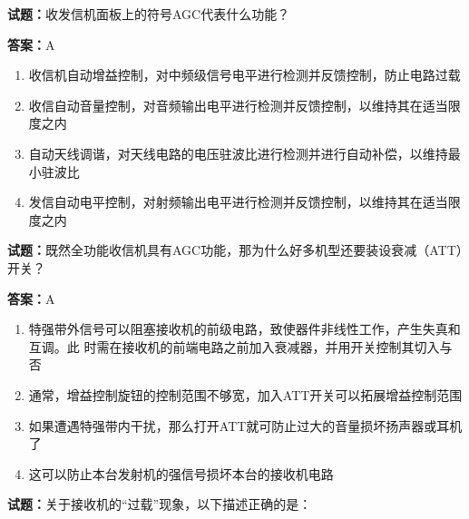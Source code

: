 \documentclass{ctexbook}
\begin{document}
\textbf{试题：}收发信机面板上的符号AGC代表什么功能？ 

\textbf{答案：}A 

\begin{enumerate}[leftmargin=3em]
  \item 收信机自动增益控制，对中频级信号电平进行检测并反馈控制，防止电路过载 

  \item 收信自动音量控制，对音频输出电平进行检测并反馈控制，以维持其在适当限度之内 

  \item 自动天线调谐，对天线电路的电压驻波比进行检测并进行自动补偿，以维持最小驻波比 

  \item 发信自动电平控制，对射频输出电平进行检测并反馈控制，以维持其在适当限度之内 

\end{enumerate}





\vspace{1em}

\textbf{试题：}既然全功能收信机具有AGC功能，那为什么好多机型还要装设衰减（ATT）开关？ 

\textbf{答案：}A 

\begin{enumerate}[leftmargin=3em]
  \item 特强带外信号可以阻塞接收机的前级电路，致使器件非线性工作，产生失真和互调。此
时需在接收机的前端电路之前加入衰减器，并用开关控制其切入与否 

  \item 通常，增益控制旋钮的控制范围不够宽，加入ATT开关可以拓展增益控制范围 

  \item 如果遭遇特强带内干扰，那么打开ATT就可防止过大的音量损坏扬声器或耳机了 

  \item 这可以防止本台发射机的强信号损坏本台的接收机电路 

\end{enumerate}





\vspace{1em}

\textbf{试题：}关于接收机的“过载”现象，以下描述正确的是： 
\end{document}
